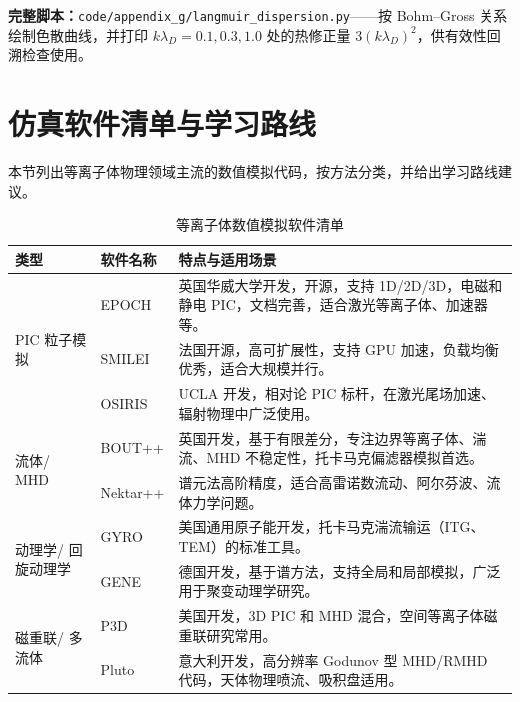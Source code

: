 \documentclass[12pt,a4paper,openany,oneside]{book}
\begin{document}
\noindent\textbf{完整脚本：}\texttt{code/\allowbreak{}appendix\_g/\allowbreak{}langmuir\_dispersion.py}——按 Bohm--Gross 关系绘制色散曲线，并打印 $k\lambda_D=0.1,0.3,1.0$ 处的热修正量 $3(k\lambda_D)^2$，供有效性回溯检查使用。



\section{仿真软件清单与学习路线}

本节列出等离子体物理领域主流的数值模拟代码，按方法分类，并给出学习路线建议。

\begin{table}[htbp]
\centering
\caption{等离子体数值模拟软件清单}
\label{tab:software}
\begin{tabular}{@{}p{2.8cm}p{3.5cm}p{6.5cm}@{}}
\toprule
\textbf{类型} & \textbf{软件名称} & \textbf{特点与适用场景} \\
\midrule
\multirow{3}{2.8cm}{PIC 粒子模拟} & EPOCH & 英国华威大学开发，开源，支持 1D/2D/3D，电磁和静电 PIC，文档完善，适合激光等离子体、加速器等。 \\
 & SMILEI & 法国开源，高可扩展性，支持 GPU 加速，负载均衡优秀，适合大规模并行。 \\
 & OSIRIS & UCLA 开发，相对论 PIC 标杆，在激光尾场加速、辐射物理中广泛使用。 \\
\midrule
\multirow{2}{2.8cm}{流体/ MHD} & BOUT++ & 英国开发，基于有限差分，专注边界等离子体、湍流、MHD 不稳定性，托卡马克偏滤器模拟首选。 \\
 & Nektar++ & 谱元法高阶精度，适合高雷诺数流动、阿尔芬波、流体力学问题。 \\
\midrule
\multirow{2}{2.8cm}{动理学/ 回旋动理学} & GYRO & 美国通用原子能开发，托卡马克湍流输运（ITG、TEM）的标准工具。 \\
 & GENE & 德国开发，基于谱方法，支持全局和局部模拟，广泛用于聚变动理学研究。 \\
\midrule
\multirow{2}{2.8cm}{磁重联/ 多流体} & P3D & 美国开发，3D PIC 和 MHD 混合，空间等离子体磁重联研究常用。 \\
 & Pluto & 意大利开发，高分辨率 Godunov 型 MHD/RMHD 代码，天体物理喷流、吸积盘适用。 \\
\bottomrule
\end{tabular}
\end{table}
\end{document}
